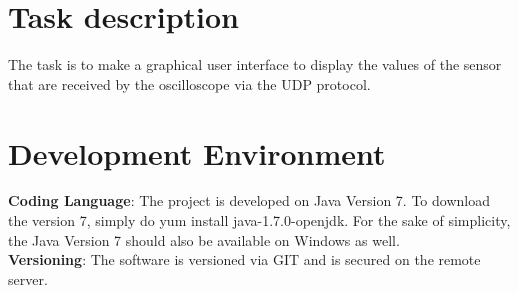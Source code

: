 \chapter{Task description}The task is to make a graphical user interface to display the values of the sensor that are received by the oscilloscope via the UDP protocol.


\chapter{Development Environment} 
\textbf{Coding Language}: The project is developed on Java Version 7. To download the version 7, simply do yum install java-1.7.0-openjdk. For the sake of simplicity, the Java Version 7 should also be available on Windows as well.\\
\textbf{Versioning}: The software is versioned via GIT and is secured on the remote server.\\



